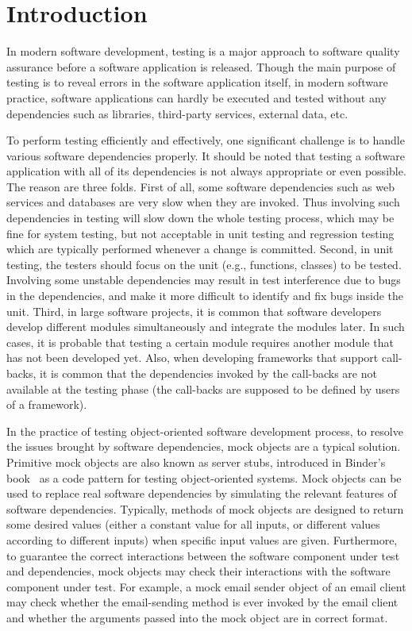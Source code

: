 \section{Introduction}
\label{sec:intromock}

In modern software development, testing is a major approach to software quality assurance before a software application is released. Though the main purpose of testing is to reveal errors in the software application itself, in modern software practice, software applications can hardly be executed and tested without any dependencies such as libraries, third-party services, external data, etc. 

To perform testing efficiently and effectively, one significant challenge is to handle various software dependencies properly. It should be noted that testing a software application with all of its dependencies is not always appropriate or even possible. The reason are three folds. First of all, some software dependencies such as web services and databases are very slow when they are invoked. Thus involving such dependencies in testing will slow down the whole testing process, which may be fine for system testing, but not acceptable in unit testing and regression testing which are typically performed whenever a change is committed. Second, in unit testing, the testers should focus on the unit (e.g., functions, classes) to be tested. Involving some unstable dependencies may result in test interference due to bugs in the dependencies, and make it more difficult to identify and fix bugs inside the unit. Third, in large software projects, it is common that software developers develop different modules simultaneously and integrate the modules later. In such cases, it is probable that testing a certain module requires another module that has not been developed yet. Also, when developing frameworks that support call-backs, it is common that the dependencies invoked by the call-backs are not available at the testing phase (the call-backs are supposed to be defined by users of a framework). 

In the practice of testing object-oriented software development process, to resolve the issues brought by software dependencies, mock objects are a typical solution. Primitive mock objects are also known as server stubs, introduced in Binder's book~\cite{binder2000testing} as a code pattern for testing object-oriented systems. Mock objects can be used to replace real software dependencies by simulating the relevant features of software dependencies. Typically, methods of mock objects are designed to return some desired values (either a constant value for all inputs, or different values according to different inputs) when specific input values are given. Furthermore, to guarantee the correct interactions between the software component under test and dependencies, mock objects may check their interactions with the software component under test. For example, a mock email sender object of an email client may check whether the email-sending method is ever invoked by the email client and whether the arguments passed into the mock object are in correct format. 

